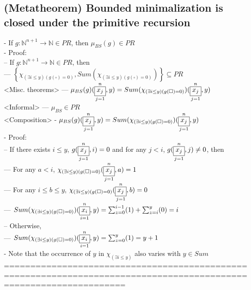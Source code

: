\documentclass{book}
\newcommand{\inot}{\not}
\newcommand{\placeholder}{\square}
\newcommand{\set}[1]{\left\{ #1 \right\}}
\newcommand{\vdc}[3]{\underset{#2}{\overset{#3}{\fbox{$#1$}}}}
\begin{document}
\subsection{(Metatheorem) Bounded minimalization is closed under the primitive recursion} %
	- If $g: \mathbb{N}^{n+1} \rightarrow \mathbb{N} \in PR$, then $\mu_{BS}(g) \in PR$ \\
	- Proof: \\
		-- If $g: \mathbb{N}^{n+1} \rightarrow \mathbb{N} \in PR$, then \\
			--- $\set{\chi_{(\exists i \leq y) (g(\placeholder) = 0)}, Sum(\chi_{(\exists i \leq y) (g(\placeholder) = 0)})} \subseteq PR$ \\ <Misc. theorems>
			--- $\mu_{BS}(g)(\vdc{x_j}{j=1}{n}, y) = Sum(\chi_{(\exists i \leq y) (g(\placeholder) = 0)})(\vdc{x_j}{j=1}{n}, y)$ \\ <Informal>
			--- $\mu_{BS} \in PR$ \\ <Composition>
	- $\mu_{BS}(g)(\vdc{x_j}{j=1}{n}, y) = Sum(\chi_{(\exists i \leq y) (g(\placeholder) = 0)})(\vdc{x_j}{j=1}{n}, y)$ \\
	- Proof: \\
		-- If there exists $i \leq y$, $g(\vdc{x_j}{j=1}{n}, i) = 0$ and for any $j < i$, $g(\vdc{x_j}{j=1}{n}, j) \inot = 0$, then \\
			--- For any $a < i$, $\chi_{(\exists i \leq y) (g(\placeholder) = 0)}(\vdc{x_j}{j=1}{n}, a) = 1$ \\
			--- For any $i \leq b \leq y$, $\chi_{(\exists i \leq y) (g(\placeholder) = 0)}(\vdc{x_j}{j=1}{n}, b) = 0$ \\
			--- $Sum(\chi_{(\exists i \leq y) (g(\placeholder) = 0)})(\vdc{x_i}{i=1}{n}, y) = \sum_{z=0}^{i-1}(1) + \sum_{z=i}^{y}(0) = i$ \\
		-- Otherwise, \\
			--- $Sum(\chi_{(\exists i \leq y) (g(\placeholder) = 0)})(\vdc{x_i}{i=1}{n}, y) = \sum_{z=0}^{y}(1) = y+1$ \\
	- Note that the occurrence of $y$ in $\chi_{(\exists i \leq y)}$ also varies with $y \in Sum$ \\
	===================================================================================================================
\end{document}

